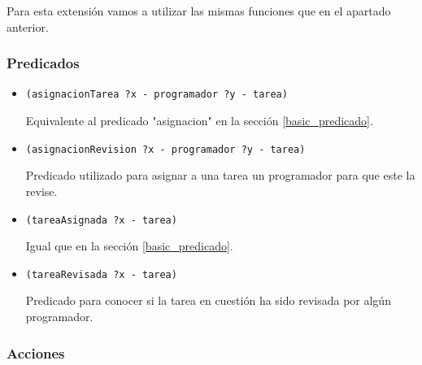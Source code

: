 \documentclass[11pt]{article}
\begin{document}
Para esta extensión vamos a utilizar las mismas funciones que en el apartado anterior.

\subsubsection{Predicados}

\begin{itemize}
  \item \verb|(asignacionTarea ?x - programador ?y - tarea)|
  
  Equivalente al predicado "asignacion" en la sección \ref{basic_predicado}.
  
  
  \item \verb|(asignacionRevision ?x - programador ?y - tarea)|
  
  Predicado utilizado para asignar a una tarea un programador para que este la revise. 
  
  
  \item \verb|(tareaAsignada ?x - tarea)|
  
  Igual que en la sección \ref{basic_predicado}.
  
  
  \item \verb|(tareaRevisada ?x - tarea)|
  
  Predicado para conocer si la tarea en cuestión ha sido revisada por algún programador.
  
\end{itemize}

\subsubsection{Acciones}
\end{document}

